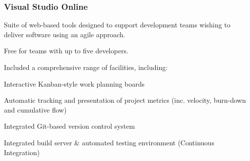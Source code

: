 \documentclass[10pt, compress]{beamer}
\begin{document}
\begin{frame}[fragile]
  \frametitle{Visual Studio Online}
  
   \small{ 
   	
   	Suite of web-based tools designed to support development teams wishing to deliver software using an agile approach.
   	
   	Free for teams with up to five developers.
   	
   	Included a comprehensive range of facilities, including:
   	
   	  \begin{itemize}
  			\footnotesize{
  			\item Interactive Kanban-style work planning boards
  			\item Automatic tracking and presentation of project metrics (inc. velocity, burn-down and cumulative flow)
  			\item Integrated Git-based version control system
  			\item Integrated build server \& automated testing environment (Continuous Integration)
  			}
  		\end{itemize}
   	
   }
   
\end{frame}
\end{document}
